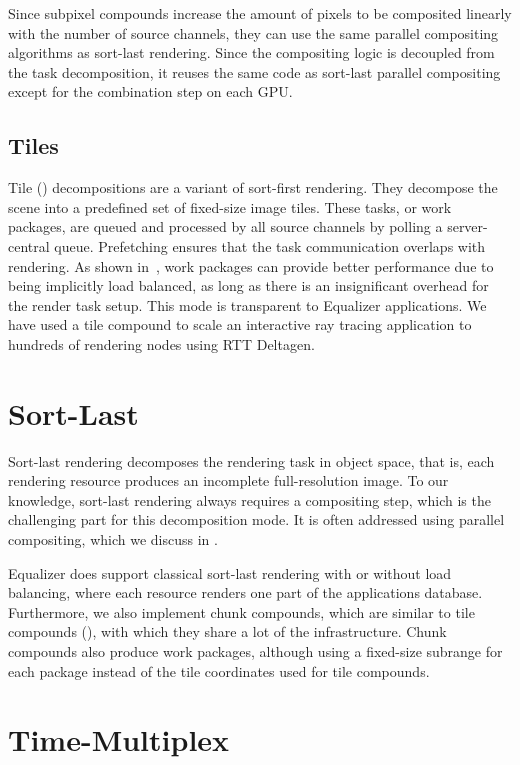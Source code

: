 Since subpixel compounds increase the amount of pixels to be composited
linearly with the number of source channels, they can use the same parallel
compositing algorithms as sort-last rendering. Since the compositing logic is
decoupled from the task decomposition, it reuses the same code as sort-last
parallel compositing except for the combination step on each GPU.

\subsection{Tiles \label{sTile}}

Tile () decompositions are a variant of sort-first rendering. They
decompose the scene into a predefined set of fixed-size image tiles. These
tasks, or work packages, are queued and processed by all source channels by
polling a server-central queue. Prefetching ensures that the task communication
overlaps with rendering. As shown in~\cite{SPEP:16}, work packages can provide
better performance due to being implicitly load balanced, as long as there is
an insignificant overhead for the render task setup. This mode is transparent
to \textsf{Equalizer} applications. We have used a tile compound to scale an
interactive ray tracing application to hundreds of rendering nodes using RTT
Deltagen.

\section{Sort-Last}

Sort-last rendering decomposes the rendering task in object space, that is,
each rendering resource produces an incomplete full-resolution image. To our
knowledge, sort-last rendering always requires a compositing step, which is the
challenging part for this decomposition mode. It is often addressed using
parallel compositing, which we discuss in .

Equalizer does support classical sort-last rendering with or without
load balancing, where each resource renders one part of the applications
database. Furthermore, we also implement chunk compounds, which are similar to
tile compounds (), with which they share a lot of the
infrastructure. Chunk compounds also produce work packages, although using a
fixed-size subrange for each package instead of the tile coordinates used for
tile compounds.

\section{Time-Multiplex}

